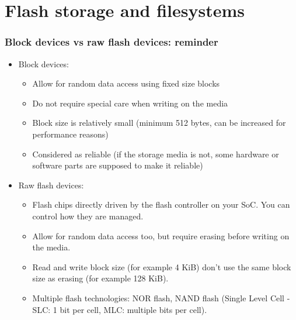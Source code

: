 \section{Flash storage and filesystems}

\begin{frame}
  \frametitle{Block devices vs raw flash devices: reminder}
  \begin{itemize}
  \item Block devices:
    \begin{itemize}
    \item Allow for random data access using fixed size blocks
    \item Do not require special care when writing on the media
    \item Block size is relatively small (minimum 512 bytes, can be
      increased for performance reasons)
    \item Considered as reliable (if the storage media is not, some
      hardware or software parts are supposed to make it reliable)
    \end{itemize}
  \item Raw flash devices:
    \begin{itemize}
    \item Flash chips directly driven by the flash controller on your SoC.
          You can control how they are managed.
    \item Allow for random data access too, but require erasing before
          writing on the media.
    \item Read and write block size (for example 4 KiB) don't use
          the same block size as erasing (for example 128 KiB).
    \item Multiple flash technologies: NOR flash, NAND
          flash (Single Level Cell - SLC: 1 bit per cell, MLC: multiple bits per cell).
    \end{itemize}
  \end{itemize}
\end{frame}

